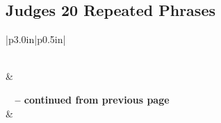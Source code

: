 \subsection{Judges 20 Repeated Phrases}


\normalsize
 
\begin{center}
\begin{longtable}{|p{3.0in}|p{0.5in}|}
\caption[Judges 20 Repeated Phrases]{Judges 20 Repeated Phrases}\label{table:Repeated Phrases Judges 20} \\
\hline {} &  \\ \hline 
\endfirsthead
 
{{\bfseries \tablename\ \thetable{} -- continued from previous page}} \\  
\hline {} &  \\ \hline 
\endhead
 

\end{longtable}
\end{center}
